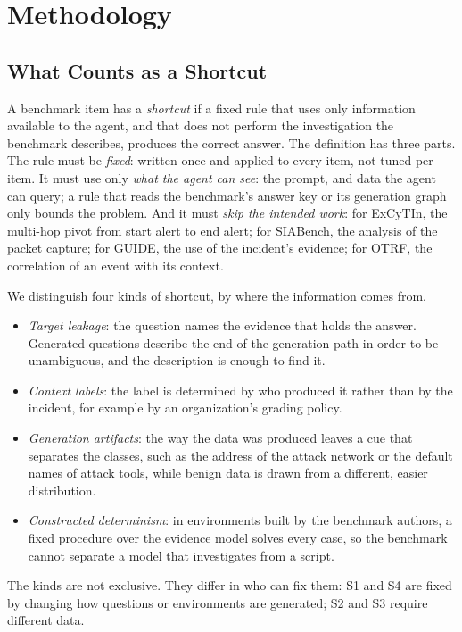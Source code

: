 \section{Methodology}
\label{sec:method}

\subsection{What Counts as a Shortcut}
\label{sec:def}

A benchmark item has a \emph{shortcut} if a fixed rule that uses only information available to the agent, and that does not perform the investigation the benchmark describes, produces the correct answer. The definition has three parts. The rule must be \emph{fixed}: written once and applied to every item, not tuned per item. It must use only \emph{what the agent can see}: the prompt, and data the agent can query; a rule that reads the benchmark's answer key or its generation graph only bounds the problem. And it must \emph{skip the intended work}: for ExCyTIn, the multi-hop pivot from start alert to end alert; for SIABench, the analysis of the packet capture; for GUIDE, the use of the incident's evidence; for OTRF, the correlation of an event with its context.

We distinguish four kinds of shortcut, by where the information comes from.
\begin{itemize}\setlength\itemsep{1pt}
\item[\textbf{S1}] \emph{Target leakage}: the question names the evidence that holds the answer. Generated questions describe the end of the generation path in order to be unambiguous, and the description is enough to find it.
\item[\textbf{S2}] \emph{Context labels}: the label is determined by who produced it rather than by the incident, for example by an organization's grading policy.
\item[\textbf{S3}] \emph{Generation artifacts}: the way the data was produced leaves a cue that separates the classes, such as the address of the attack network or the default names of attack tools, while benign data is drawn from a different, easier distribution.
\item[\textbf{S4}] \emph{Constructed determinism}: in environments built by the benchmark authors, a fixed procedure over the evidence model solves every case, so the benchmark cannot separate a model that investigates from a script.
\end{itemize}
The kinds are not exclusive. They differ in who can fix them: S1 and S4 are fixed by changing how questions or environments are generated; S2 and S3 require different data.

